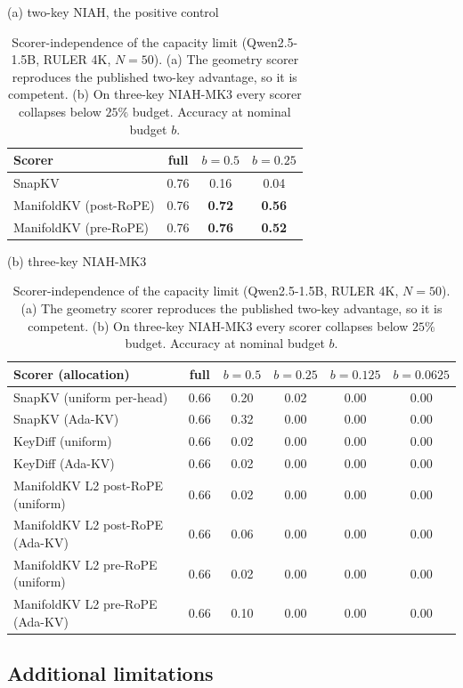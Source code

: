 \begin{table}[h]
\centering
\caption{Scorer-independence of the capacity limit (Qwen2.5-1.5B, RULER 4K,
$N = 50$). (a) The geometry scorer reproduces the published two-key advantage,
so it is competent. (b) On three-key NIAH-MK3 every scorer collapses below
$25\%$ budget. Accuracy at nominal budget $b$.}
\label{tab:scorer-independence}
\small
(a) two-key NIAH, the positive control \\[2pt]
\begin{tabular}{lccc}
\toprule
Scorer & full & $b = 0.5$ & $b = 0.25$ \\
\midrule
SnapKV                 & 0.76 & 0.16 & 0.04 \\
ManifoldKV (post-RoPE) & 0.76 & \textbf{0.72} & \textbf{0.56} \\
ManifoldKV (pre-RoPE)  & 0.76 & \textbf{0.76} & \textbf{0.52} \\
\bottomrule
\end{tabular}

\vspace{6pt}
(b) three-key NIAH-MK3 \\[2pt]
\begin{tabular}{lccccc}
\toprule
Scorer (allocation) & full & $b = 0.5$ & $b = 0.25$ & $b = 0.125$ & $b = 0.0625$ \\
\midrule
SnapKV (uniform per-head)         & 0.66 & 0.20 & 0.02 & 0.00 & 0.00 \\
SnapKV (Ada-KV)                   & 0.66 & 0.32 & 0.00 & 0.00 & 0.00 \\
KeyDiff (uniform)                 & 0.66 & 0.02 & 0.00 & 0.00 & 0.00 \\
KeyDiff (Ada-KV)                  & 0.66 & 0.02 & 0.00 & 0.00 & 0.00 \\
ManifoldKV L2 post-RoPE (uniform) & 0.66 & 0.02 & 0.00 & 0.00 & 0.00 \\
ManifoldKV L2 post-RoPE (Ada-KV)  & 0.66 & 0.06 & 0.00 & 0.00 & 0.00 \\
ManifoldKV L2 pre-RoPE (uniform)  & 0.66 & 0.02 & 0.00 & 0.00 & 0.00 \\
ManifoldKV L2 pre-RoPE (Ada-KV)   & 0.66 & 0.10 & 0.00 & 0.00 & 0.00 \\
\bottomrule
\end{tabular}
\end{table}

\subsection{Additional limitations}

